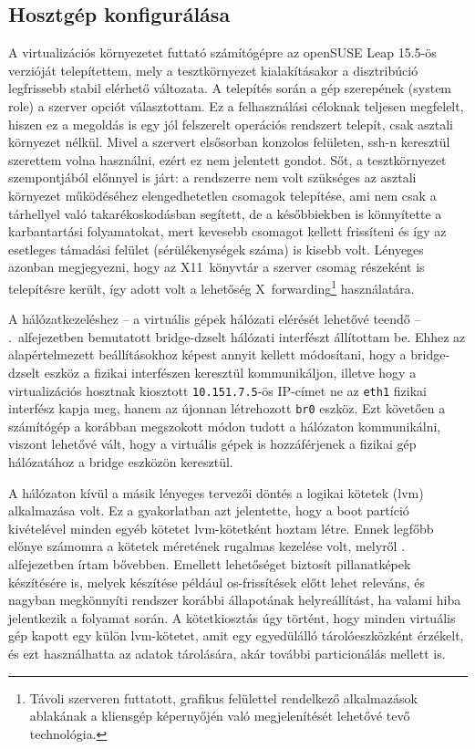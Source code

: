 \subsection{Hosztgép konfigurálása}
A virtualizációs környezetet futtató számítógépre az openSUSE Leap 15.5-ös verzióját telepítettem, mely a tesztkörnyezet kialakításakor a disztribúció legfrissebb stabil elérhető változata. A telepítés során a gép szerepének (system role) a szerver opciót választottam. Ez a felhasználási céloknak teljesen megfelelt, hiszen ez a megoldás is egy jól felszerelt operációs rendszert telepít, csak asztali környezet nélkül. Mivel a szervert elsősorban konzolos felületen, \acrshort{ssh}-n keresztül szerettem volna használni, ezért ez nem jelentett gondot. Sőt, a tesztkörnyezet szempontjából előnnyel is járt: a rendszerre nem volt szükséges az asztali környezet működéséhez elengedhetetlen csomagok telepítése, ami nem csak a tárhellyel való takarékoskodásban segített, de a későbbiekben is könnyítette a karbantartási folyamatokat, mert kevesebb csomagot kellett frissíteni és így az esetleges támadási felület (sérülékenységek száma) is kisebb volt. Lényeges azonban megjegyezni, hogy az X11~könyvtár a szerver csomag részeként is telepítésre került, így adott volt a lehetőség X~forwarding\footnote{Távoli szerveren futtatott, grafikus felülettel rendelkező alkalmazások ablakának a kliensgép képernyőjén való megjelenítését lehetővé tevő technológia.} használatára.

A hálózatkezeléshez -- a virtuális gépek hálózati elérését lehetővé teendő -- .~alfejezetben bemutatott bridge-dzselt hálózati interfészt állítottam be. Ehhez az alapértelmezett beállításokhoz képest annyit kellett módosítani, hogy a bridge-dzselt eszköz a fizikai interfészen keresztül kommunikáljon, illetve hogy a virtualizációs hosztnak kiosztott \texttt{10.151.7.5}-ös IP-címet ne az \texttt{eth1} fizikai interfész kapja meg, hanem az újonnan létrehozott \texttt{br0} eszköz. Ezt követően a számítógép a korábban megszokott módon tudott a hálózaton kommunikálni, viszont lehetővé vált, hogy a virtuális gépek is hozzáférjenek a fizikai gép hálózatához a bridge eszközön keresztül.

A hálózaton kívül a másik lényeges tervezői döntés a logikai kötetek (\acrshort{lvm}) alkalmazása volt. Ez a gyakorlatban azt jelentette, hogy a boot partíció kivételével minden egyéb kötetet \acrshort{lvm}-kötetként hoztam létre. Ennek legfőbb előnye számomra a kötetek méretének rugalmas kezelése volt, melyről . alfejezetben írtam bővebben. Emellett lehetőséget biztosít pillanatképek készítésére is, melyek készítése például \acrshort{os}-frissítések előtt lehet releváns, és nagyban megkönnyíti rendszer korábbi állapotának helyreállítást, ha valami hiba jelentkezik a folyamat során. A kötetkiosztás úgy történt, hogy minden virtuális gép kapott egy külön \acrshort{lvm}-kötetet, amit egy egyedülálló tárolóeszközként érzékelt, és ezt használhatta az adatok tárolására, akár további particionálás mellett is.

